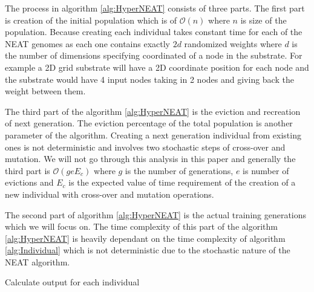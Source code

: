 \documentclass[twocolumn]{article}
\begin{document}
The process in algorithm \ref{alg:HyperNEAT} consists of three parts. The first part is creation of the initial population which is of $\mathcal{O}(n)$ where $n$ is size of the population. Because creating each individual takes constant time for each of the NEAT genomes as each one contains exactly $2d$ randomized weights where $d$ is the number of dimensions specifying coordinated of a node in the substrate. For example a 2D grid substrate will have a 2D coordinate position for each node and the substrate would have 4 input nodes taking in 2 nodes and giving back the weight between them.

The third part of the algorithm \ref{alg:HyperNEAT} is the eviction and recreation of next generation. The eviction percentage of the total population is another parameter of the algorithm. Creating a next generation individual from existing ones is not deterministic and involves two stochastic steps of cross-over and mutation. We will not go through this analysis in this paper and generally the third part is $\mathcal{O}(geE_c)$ where $g$ is the number of generations, $e$ is number of evictions and $E_c$ is the expected value of time requirement of the creation of a new individual with cross-over and mutation operations.

The second part of algorithm \ref{alg:HyperNEAT} is the actual training generations which we will focus on. The time complexity of this part of the  algorithm \ref{alg:HyperNEAT} is heavily dependant on the time complexity of algorithm \ref{alg:Individual} which is not deterministic due to the stochastic nature of the NEAT algorithm.

\begin{algorithm}
    \caption{Calculate output for each individual}
    \label{alg:Individual}
    \begin{algorithmic}[1]
                    \EndIf
                \EndFor
            \EndFor
            \EndFor
            \EndFor
            \State {}
        \EndProcedure
                \State {}
            \EndIf
            \EndFor
            \State {}
        \EndProcedure
    \end{algorithmic}
\end{algorithm}
\end{document}
